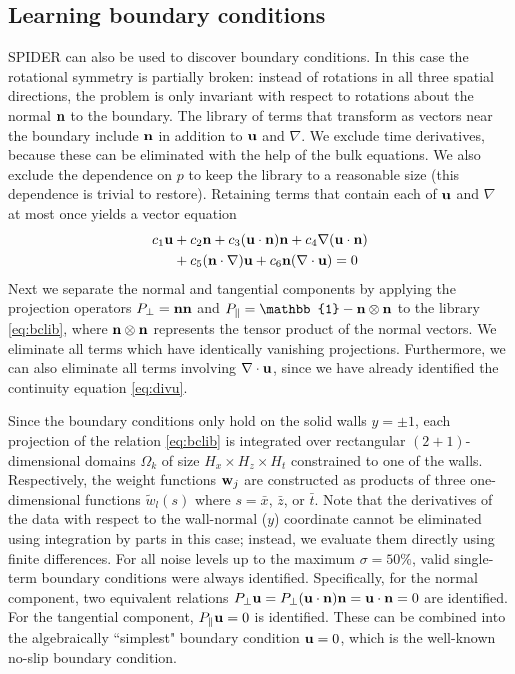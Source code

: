 \documentclass[
 reprint,
 amsmath,amssymb,
 aps,
]{revtex4-2}
\begin{document}
\subsection*{Learning boundary conditions}
SPIDER can also be used to discover boundary conditions. In this case the rotational symmetry is partially broken: instead of rotations in all three spatial directions, the problem is only invariant with respect to rotations about the normal ${\bf n}$ to the boundary. The library of terms that transform as vectors near the boundary include ${\bf n}$ in addition to ${\bf u}$ and $\nabla$. We exclude time derivatives, because these can be eliminated with the help of the bulk equations. We also exclude the dependence on $p$ to keep the library to a reasonable size (this dependence is trivial to restore). Retaining terms that contain each of ${\bf u}$ and $\nabla$ at most once yields a vector equation
\begin{align}\label{eq:bclib}
    c_1{\bf u}&+c_2{\bf n}+c_3({\bf u} \cdot {\bf n}){\bf n}+c_4\nabla({\bf u} \cdot {\bf n})\nonumber\\&+c_5({\bf n}\cdot \nabla){\bf u}+c_6{\bf n}(\nabla \cdot {\bf u})= 0
\end{align}
Next we separate the normal and tangential components by applying the projection operators $P_\perp={\bf n}{\bf n}$ and $P_\parallel=\mathbb{1}-{\bf n}\otimes{\bf n}$ to the library \eqref{eq:bclib}, where ${\bf n}\otimes{\bf n}$ represents the tensor product of the normal vectors. We eliminate all terms which have identically vanishing projections. Furthermore, we can also eliminate all terms involving $\nabla\cdot{\bf u}$, since we have already identified the continuity equation \eqref{eq:divu}.

Since the boundary conditions only hold on the solid walls $y=\pm 1$, each projection of the relation \eqref{eq:bclib} is integrated over rectangular $(2+1)$-dimensional domains $\Omega_k$ of size $H_x\times H_z\times H_t$ constrained to one of the walls. Respectively, the weight functions ${\bf w}_j$ are constructed as products of three one-dimensional functions $\tilde{w}_l(s)$ where $s=\bar{x}$, $\bar{z}$, or $\bar{t}$. Note that the derivatives of the data with respect to the wall-normal ($y$) coordinate cannot be eliminated using integration by parts in this case; instead, we evaluate them directly using finite differences.
For all noise levels up to the maximum $\sigma = 50\%$, valid single-term boundary conditions were always identified. Specifically, for the normal component, two equivalent relations $P_\perp {\bf u} = P_\perp ({\bf u} \cdot {\bf n}){\bf n} = {\bf u} \cdot {\bf n} = 0$ are identified. For the tangential component, $P_\parallel {\bf u} = 0$ is identified. These can be combined into the algebraically ``simplest" boundary condition ${\bf u}=0$, which is the well-known no-slip boundary condition.
\end{document}
